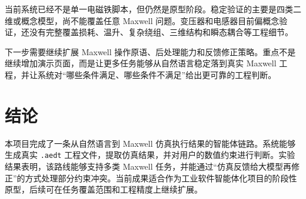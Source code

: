 \documentclass[11pt,a4paper]{ctexart}
\begin{document}
当前系统已经不是单一电磁铁脚本，但仍然是原型阶段。稳定验证的主要是四类二维或概念模型，尚不能覆盖任意 Maxwell 问题。变压器和电感器目前偏概念验证，还没有完整覆盖损耗、温升、复杂绕组、三维结构和瞬态耦合等工程细节。

下一步需要继续扩展 Maxwell 操作原语、后处理能力和反馈修正策略。重点不是继续增加演示页面，而是让更多任务能够从自然语言稳定落到真实 Maxwell 工程，并让系统对“哪些条件满足、哪些条件不满足”给出更可靠的工程判断。

\section{结论}

本项目完成了一条从自然语言到 Maxwell 仿真执行结果的智能体链路。系统能够生成真实 \texttt{.aedt} 工程文件，提取仿真结果，并对用户的数值约束进行判断。实验结果表明，该路线能够支持多类 Maxwell 任务，并能通过“仿真反馈给大模型再修正”的方式处理部分约束冲突。当前成果适合作为工业软件智能体化项目的阶段性原型，后续可在任务覆盖范围和工程精度上继续扩展。
\end{document}
